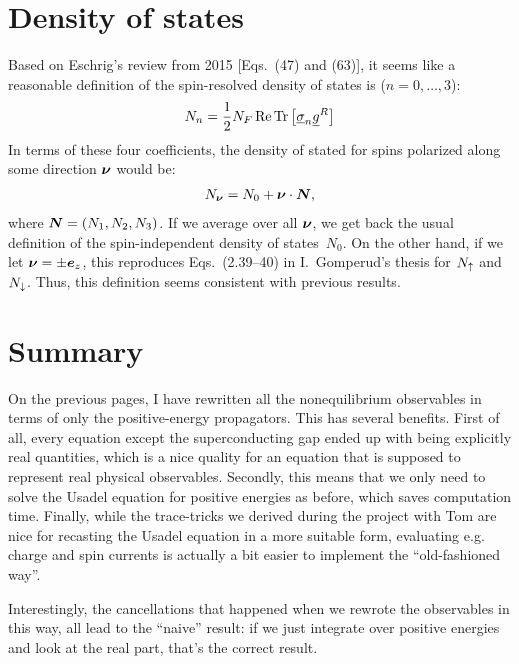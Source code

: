 \clearpage
\section{Density of states}
Based on Eschrig's review from 2015 [Eqs.~(47) and (63)], it seems like a reasonable definition of the spin-resolved density of states is ($n=0,\ldots,3$):
\begin{align}
  N_n = \frac{1}{2}N_F \operatorname{Re}\operatorname{Tr}\big[\underline{\sigma}_{n} \underline{g}^R\big]
\end{align}
In terms of these four coefficients, the density of stated for spins polarized along some direction $\bm{\nu}$ would be:
\begin{align}
  N_{\bm{\nu}}  = N_0 + \bm{\nu} \cdot \bm{N},
\end{align}
where $\bm{N} = (N_1, N_2, N_3)$.
If we average over all $\bm{\nu}$, we get back the usual definition of the spin-independent density of states~$N_0$.
On the other hand, if we let $\bm{\nu} = \pm\bm{e}_z$, this reproduces Eqs.~(2.39--40) in I.~Gomperud's thesis for $N_\uparrow$ and $N_\downarrow$.
Thus, this definition seems consistent with previous results.

\section{Summary}
On the previous pages, I have rewritten all the nonequilibrium observables in terms of only the positive-energy propagators.
This has several benefits.
First of all, every equation except the superconducting gap ended up with being explicitly real quantities, which is a nice quality for an equation that is supposed to represent real physical observables.
Secondly, this means that we only need to solve the Usadel equation for positive energies as before, which saves computation time.
Finally, while the trace-tricks we derived during the project with Tom are nice for recasting the Usadel equation in a more suitable form, evaluating e.g. charge and spin currents is actually a bit easier to implement the ``old-fashioned way''.

Interestingly, the cancellations that happened when we rewrote the observables in this way, all lead to the ``naive'' result: if we just integrate over positive energies and look at the real part, that's the correct result.
